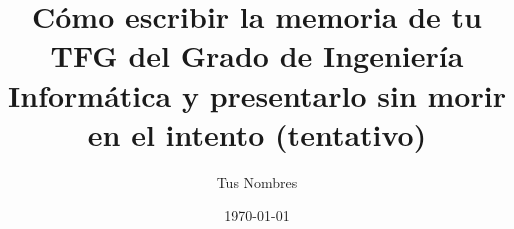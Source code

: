 \documentclass{book}
\begin{document}
\title{Cómo escribir la memoria de tu TFG del Grado de Ingeniería Informática y presentarlo sin morir en el intento (tentativo)}
\author{Tus Nombres}
\date{\today}
\maketitle

\tableofcontents
\listoftables
\listoffigures





















\appendix

\end{document}
